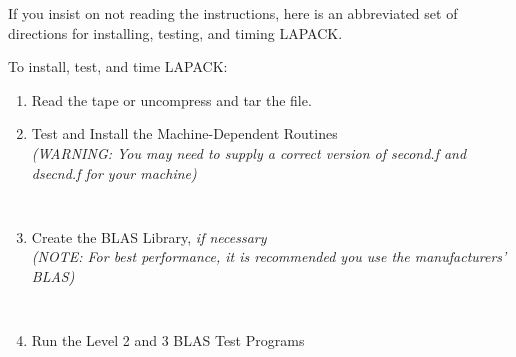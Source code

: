 If you insist on not reading the instructions, here is an abbreviated
set of directions for installing, testing, and timing LAPACK.

To install, test, and time LAPACK:

\begin{enumerate}
\item Read the tape or uncompress and tar the file.
\item Test and Install the Machine-Dependent Routines \\
{\em (WARNING:  You may need to supply a correct version of second.f and
dsecnd.f for your machine)}
{\tt
{} }
\item Create the BLAS Library, {\em if necessary} \\
{\em (NOTE:  For best performance, it is recommended you use the manufacturers' BLAS)}
{\tt
{} }
\item Run the Level 2 and 3 BLAS Test Programs
{\tt
{}}
\end{enumerate}
